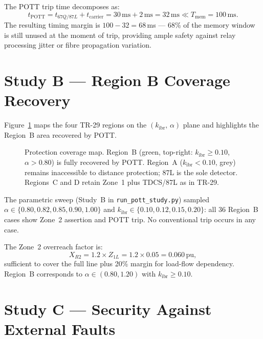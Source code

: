 \documentclass[11pt,a4paper]{article}
\begin{document}
\noindent
The POTT trip time decomposes as:
\begin{equation}
  t_\mathrm{POTT} = t_{67Q/87L} + t_\mathrm{carrier} = 30\,\text{ms} + 2\,\text{ms}
  = 32\,\text{ms} \ll T_\mathrm{mem} = 100\,\text{ms}.
  \label{eq:pott_time}
\end{equation}
The resulting timing margin is $100 - 32 = 68$\,ms --- 68\% of the memory window
is still unused at the moment of trip, providing ample safety against relay
processing jitter or fibre propagation variation.

\section{Study B --- Region B Coverage Recovery}
\label{sec:coverage}

Figure~\ref{fig:coverage} maps the four TR-29 regions on the
$(k_\mathrm{ibr},\,\alpha)$ plane and highlights the Region~B area recovered by POTT.

\begin{figure}[htbp]
  \centering
  \resizebox{0.80\textwidth}{!}{%
  }
  \caption{Protection coverage map.  Region~B (green, top-right: $k_\mathrm{ibr}
           \geq0.10$, $\alpha>0.80$) is fully recovered by POTT.  Region~A
           ($k_\mathrm{ibr}<0.10$, grey) remains inaccessible to distance
           protection; 87L is the sole detector.  Regions~C and D retain
           Zone~1 plus TDCS/87L as in TR-29.}
  \label{fig:coverage}
\end{figure}

\noindent
The parametric sweep (Study~B in \texttt{run\_pott\_study.py}) sampled
$\alpha\in\{0.80, 0.82, 0.85, 0.90, 1.00\}$ and
$k_\mathrm{ibr}\in\{0.10, 0.12, 0.15, 0.20\}$: all 36 Region~B cases show
Zone~2 assertion and POTT trip.  No conventional trip occurs in any case.

The Zone~2 overreach factor is:
\begin{equation}
  X_{R2} = 1.2 \times Z_{1L} = 1.2 \times 0.05 = 0.060\,\text{pu},
  \label{eq:reach_z2}
\end{equation}
sufficient to cover the full line plus 20\% margin for load-flow dependency.
Region~B corresponds to $\alpha\in(0.80, 1.20)$ with $k_\mathrm{ibr}\geq0.10$.

\section{Study C --- Security Against External Faults}
\label{sec:security}
\end{document}
